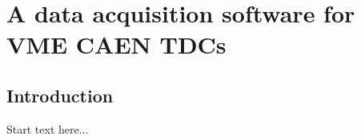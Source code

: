 \graphicspath{{chapt_dutch/}{intro/}{chapt2/}{chapt3/}{chapt4/}{chapt5/}{chapt6/}{chapt7/}{chapt8/}}

\renewcommand\evenpagerightmark{{\scshape\small Appendix A}}
\renewcommand\oddpageleftmark{{\scshape\small A data acquisition software for VME CAEN TDCs}}

\renewcommand{\bibname}{References}

\hyphenation{}

\chapter[A data acquisition software for VME CAEN TDCs]%
{A data acquisition software for VME CAEN TDCs}
\label{app1}

\section{Introduction}
Start text here...

\clearpage{\pagestyle{empty}\cleardoublepage}
